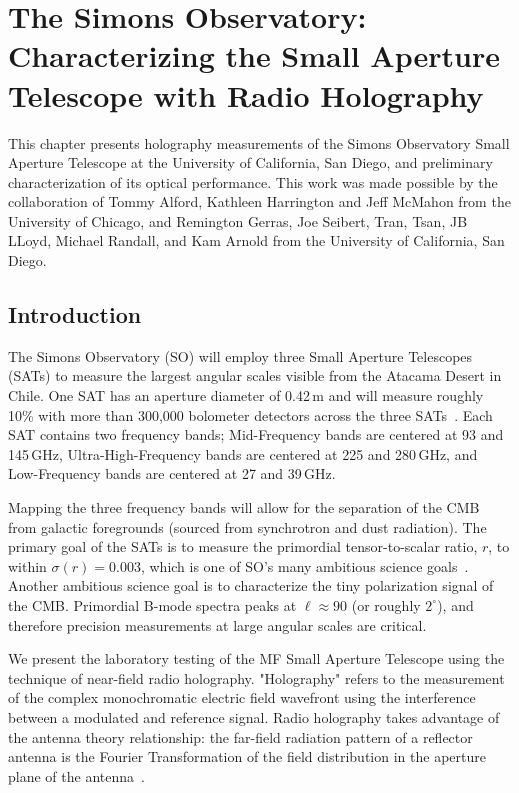 \chapter{The Simons Observatory: Characterizing the Small Aperture Telescope with Radio Holography}
\label{ch:sat_holo}
This chapter presents holography measurements of the Simons Observatory Small Aperture Telescope at the University of California, San Diego, and preliminary characterization of its optical performance.  This work was made possible by the collaboration of Tommy Alford, Kathleen Harrington and Jeff McMahon from the University of Chicago, and Remington Gerras, Joe Seibert, Tran, Tsan, JB LLoyd, Michael Randall, and Kam Arnold from the University of California, San Diego.

\section{Introduction}
The Simons Observatory (SO) will employ three Small Aperture Telescopes (SATs) to measure the largest angular scales visible from the Atacama Desert in Chile.  One SAT has an aperture diameter of 0.42\,m and will measure roughly 10\% with more than 300,000 bolometer detectors across the three SATs~\cite{2020SPIE11445E7LK}.  Each SAT contains two frequency bands; Mid-Frequency bands are centered at 93 and 145\,GHz, Ultra-High-Frequency bands are centered at 225 and 280\,GHz, and Low-Frequency bands are centered at 27 and 39\,GHz.  

Mapping the three frequency bands will allow for the separation of the CMB from galactic foregrounds (sourced from synchrotron and dust radiation).  The primary goal of the SATs is to measure the primordial tensor-to-scalar ratio, $r$, to within $\sigma(r) = 0.003$, which is one of SO's many ambitious science goals~\cite{ali20}.  Another ambitious science goal is to characterize the tiny polarization signal of the CMB.  Primordial B-mode spectra peaks at $\ell\approx90$ (or roughly $2^{\circ}$), and therefore precision measurements at large angular scales are critical.

We present the laboratory testing of the MF Small Aperture Telescope using the technique of near-field radio holography.  "Holography" refers to the measurement of the complex monochromatic electric field wavefront using the interference between a modulated and reference signal.  Radio holography takes advantage of the antenna theory relationship: the far-field radiation pattern of a reflector antenna is the Fourier Transformation of the field distribution in the aperture plane of the antenna~\cite{alma_holog}.

